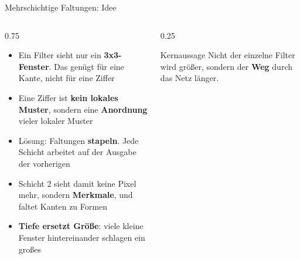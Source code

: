 \begin{frame}{Mehrschichtige Faltungen: Idee}
\begin{columns}
\begin{column}{0.75\linewidth}
\begin{itemize}
  \item Ein Filter sieht nur ein \textbf{3x3-Fenster}. Das genügt für eine Kante, nicht für eine Ziffer
  \item Eine Ziffer ist \textbf{kein lokales Muster}, sondern eine \textbf{Anordnung} vieler lokaler Muster
  \item Lösung: Faltungen \textbf{stapeln}. Jede Schicht arbeitet auf der Ausgabe der vorherigen
  \item Schicht 2 sieht damit keine Pixel mehr, sondern \textbf{Merkmale}, und faltet Kanten zu Formen
  \item \textbf{Tiefe ersetzt Größe}: viele kleine Fenster hintereinander schlagen ein großes
\end{itemize}
\end{column}
\begin{column}{0.25\linewidth}
\begin{block}{Kernaussage}
Nicht der einzelne Filter wird größer, sondern der \textbf{Weg} durch das Netz länger.
\end{block}
\end{column}
\end{columns}
\end{frame}

